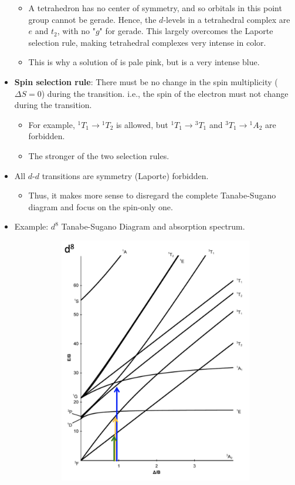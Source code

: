 \documentclass[../notes.tex]{subfiles}
\begin{document}
\begin{itemize}
    \begin{itemize}
        \item A tetrahedron has no center of symmetry, and so orbitals in this point group cannot be gerade. Hence, the $d$-levels in a tetrahedral complex are $e$ and $t_2$, with no "$g$" for gerade. This largely overcomes the Laporte selection rule, making tetrahedral complexes very intense in color.
        \item This is why a solution of  is pale pink, but  is a very intense blue.
    \end{itemize}
    \item \textbf{Spin selection rule}: There must be no change in the spin multiplicity ($\Delta S=0$) during the transition. i.e., the spin of the electron must not change during the transition.
    \begin{itemize}
        \item For example, ${}^1T_1\to{}^1T_2$ is allowed, but ${}^1T_1\to{}^3T_1$ and ${}^3T_1\to{}^1A_2$ are forbidden.
        \item The stronger of the two selection rules.
    \end{itemize}
    \item All $d$-$d$ transitions are symmetry (Laporte) forbidden.
    \begin{itemize}
        \item Thus, it makes more sense to disregard the complete Tanabe-Sugano diagram and focus on the spin-only one.
    \end{itemize}
    \item Example: $d^8$ Tanabe-Sugano Diagram and  absorption spectrum.
    \begin{figure}[h!]
        \centering
        \begin{subfigure}[b]{0.45\linewidth}
            \centering
            \includegraphics[width=0.8\linewidth]{../ExtFiles/NiH2O6a.png}

\end{subfigure}
\end{figure}
\end{itemize}
\end{document}
